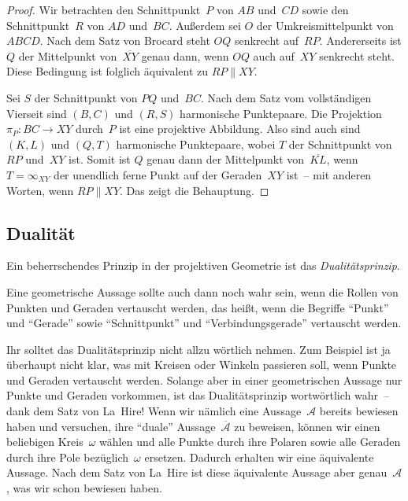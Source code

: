 \begin{proof}
	Wir betrachten den Schnittpunkt~$P$ von $AB$ und~$CD$ sowie den Schnittpunkt~$R$ von $AD$ und~$BC$. Außerdem sei $O$ der Umkreismittelpunkt von $ABCD$. Nach dem Satz von Brocard steht $OQ$ senkrecht auf~$RP$. Andererseits ist $Q$ der Mittelpunkt von~$\overline{XY}$ genau dann, wenn $OQ$ auch auf~$XY$ senkrecht steht. Diese Bedingung ist folglich äquivalent zu $RP\parallel XY$.
	
	Sei $S$ der Schnittpunkt von $PQ$ und~$BC$. Nach dem Satz vom vollständigen Vierseit sind $(B,C)$ und $(R,S)$ harmonische Punktepaare. Die Projektion $\pi_P\colon BC\to XY$ durch~$P$ ist eine projektive Abbildung. Also sind auch sind $(K,L)$ und $(Q,T)$ harmonische Punktepaare, wobei $T$ der Schnittpunkt von $RP$ und~$XY$ ist. Somit ist $Q$ genau dann der Mittelpunkt von~$\overline{KL}$, wenn $T=\infty_{XY}$ der unendlich ferne Punkt auf der Geraden~$XY$ ist~-- mit anderen Worten, wenn $RP\parallel XY$. Das zeigt die Behauptung.
\end{proof}

\subsection*{Dualität}
Ein beherrschendes Prinzip in der projektiven Geometrie ist das \emph{Dualitätsprinzip}.

\begin{satzmitnamen}[Dualitätsprinzip]
	Eine geometrische Aussage sollte auch dann noch wahr sein, wenn die Rollen von Punkten und Geraden vertauscht werden, das heißt, wenn die Begriffe \enquote{Punkt} und \enquote{Gerade} sowie \enquote{Schnittpunkt} und \enquote{Verbindungsgerade} vertauscht werden.
\end{satzmitnamen}

Ihr solltet das Dualitätsprinzip nicht allzu wörtlich nehmen. Zum Beispiel ist ja überhaupt nicht klar, was mit Kreisen oder Winkeln passieren soll, wenn Punkte und Geraden vertauscht werden. Solange aber in einer geometrischen Aussage nur Punkte und Geraden vorkommen, ist das Dualitätsprinzip wortwörtlich wahr~-- dank dem Satz von La~Hire! Wenn wir nämlich eine Aussage~$\mathcal A$ bereits bewiesen haben und versuchen, ihre \enquote{duale} Aussage~$\overline{\mathcal A}$ zu beweisen, können wir einen beliebigen Kreis~$\omega$ wählen und alle Punkte durch ihre Polaren sowie alle Geraden durch ihre Pole bezüglich~$\omega$ ersetzen. Dadurch erhalten wir eine äquivalente Aussage. Nach dem Satz von La~Hire ist diese äquivalente Aussage aber genau~$\mathcal A$, was wir schon bewiesen haben.

